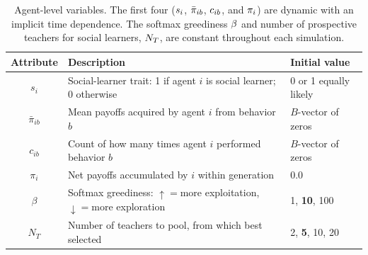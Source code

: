 \documentclass[letterpaper,11.5pt]{scrartcl}
\begin{document}

\begin{table}[h]
  \vspace{2em}
  \caption{Agent-level variables. The first four ($\protect s_i$, $\protect
    \bar\pi_{ib}$, $\protect c_{ib}$,
  and $\protect \pi_i$) are dynamic with an implicit time dependence. The softmax
greediness $\protect \beta$ and number of prospective teachers for social learners,
$\protect N_T$, are constant throughout each simulation.}
    \label{tab:modelParameters}
    \centering \hspace{-1em}
    \begin{tabular}{cp{4.5in}p{1.25in}} \toprule

        Attribute & Description & Initial value \\ 

        \midrule  

        $s_i$  & Social-learner trait: 1 if agent $i$ is social learner; 0 otherwise & 0
        or 1 equally likely \\

        $\bar\pi_{ib}$ & Mean payoffs acquired by agent $i$ from behavior $b$
                       & $B$-vector of zeros \\

        $c_{ib}$ & Count of how many times agent $i$ performed behavior $b$ 
              & $B$-vector of zeros \\

        $\pi_i$ & Net payoffs accumulated by $i$ within generation & 0.0 \\

        $\beta$ & Softmax greediness: $\uparrow=$more exploitation, $\downarrow=$more
                    exploration 
               & 1, \textbf{10}, 100 \\
        
        $N_T$    & Number of teachers to pool, from which best selected 
                 & 2, \textbf{5}, 10, 20  \\

        \bottomrule
    \end{tabular}
\end{table}
\end{document}
